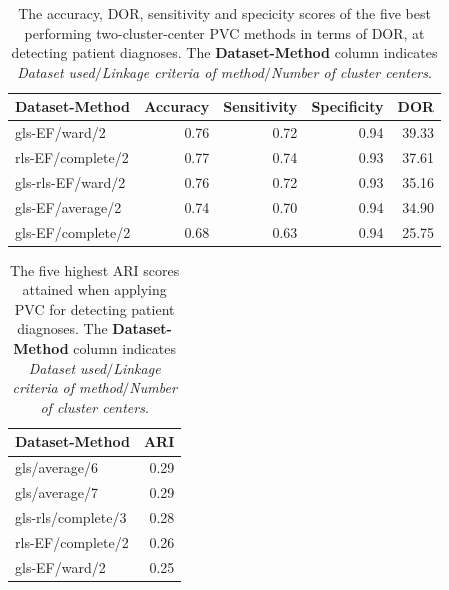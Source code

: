 \begin{table}
    \centering
    \begin{tabular}{lrrrr}
        \toprule
        Dataset-Method    &  Accuracy &  Sensitivity &  Specificity &   DOR \\
        \midrule
        gls-EF/ward/2     &      0.76 &         0.72 &         0.94 & 39.33 \\
        rls-EF/complete/2 &      0.77 &         0.74 &         0.93 & 37.61 \\
        gls-rls-EF/ward/2 &      0.76 &         0.72 &         0.93 & 35.16 \\
        gls-EF/average/2  &      0.74 &         0.70 &         0.94 & 34.90 \\
        gls-EF/complete/2 &      0.68 &         0.63 &         0.94 & 25.75 \\
        \bottomrule
    \end{tabular}
    \caption{The accuracy, DOR, sensitivity and specicity scores of the five best performing two-cluster-center PVC methods in terms of DOR, at detecting patient diagnoses.
             The \textbf{Dataset-Method} column indicates \textit{Dataset used}$/$\textit{Linkage criteria of method}$/$\textit{Number of cluster centers}.}
    \label{tab:pvc_ind_dor_sens_spec_dist}
\end{table}

\begin{table}
    \centering
    \begin{tabular}{lr}
        \toprule
        Dataset-Method     &  ARI \\
        \midrule
        gls/average/6      & 0.29 \\
        gls/average/7      & 0.29 \\
        gls-rls/complete/3 & 0.28 \\
        rls-EF/complete/2  & 0.26 \\
        gls-EF/ward/2      & 0.25 \\
        \bottomrule
    \end{tabular}
    \caption{The five highest ARI scores attained when applying PVC for detecting patient diagnoses.
             The \textbf{Dataset-Method} column indicates \textit{Dataset used}$/$\textit{Linkage criteria of method}$/$\textit{Number of cluster centers}.}
    \label{tab:pvc_ind_ari}
\end{table}

